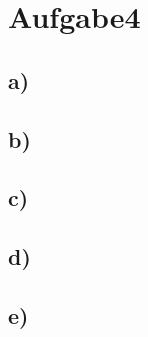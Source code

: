 \newpage
\section{Aufgabe4}
\label{sec:a4}

\subsection{a)}
\label{subsec:a4a}

\subsection{b)}
\label{subsec:a4b}

\subsection{c)}
\label{subsec:a4c}

\subsection{d)}
\label{subsec:a4d}


\subsection{e)}
\label{subsec:a4e}
